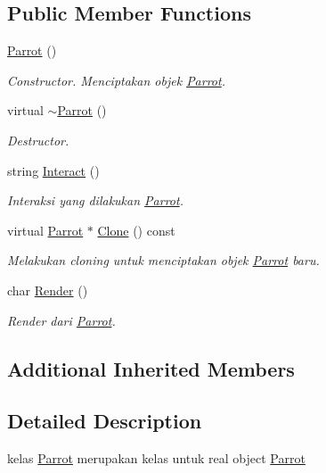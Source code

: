 \subsection*{Public Member Functions}
\begin{DoxyCompactItemize}
\item 
\hyperlink{classParrot_adfd08f638064b09dc46924ded14d1b32}{Parrot} ()
\begin{DoxyCompactList}\small\item\em Constructor. Menciptakan objek \hyperlink{classParrot}{Parrot}. \end{DoxyCompactList}\item 
virtual \hyperlink{classParrot_a02300897ced64c5a28347d385f4f0f00}{$\sim$\+Parrot} ()
\begin{DoxyCompactList}\small\item\em Destructor. \end{DoxyCompactList}\item 
string \hyperlink{classParrot_a3fdf1aa0851d53d31b5d225d755e4995}{Interact} ()
\begin{DoxyCompactList}\small\item\em Interaksi yang dilakukan \hyperlink{classParrot}{Parrot}. \end{DoxyCompactList}\item 
virtual \hyperlink{classParrot}{Parrot} $\ast$ \hyperlink{classParrot_aec7fd1385827d67522e1baf3242078b0}{Clone} () const 
\begin{DoxyCompactList}\small\item\em Melakukan cloning untuk menciptakan objek \hyperlink{classParrot}{Parrot} baru. \end{DoxyCompactList}\item 
char \hyperlink{classParrot_a27c491ab4ae56491fbe8d74e494bc46d}{Render} ()
\begin{DoxyCompactList}\small\item\em Render dari \hyperlink{classParrot}{Parrot}. \end{DoxyCompactList}\end{DoxyCompactItemize}
\subsection*{Additional Inherited Members}


\subsection{Detailed Description}
kelas \hyperlink{classParrot}{Parrot} merupakan kelas untuk real object \hyperlink{classParrot}{Parrot} 

